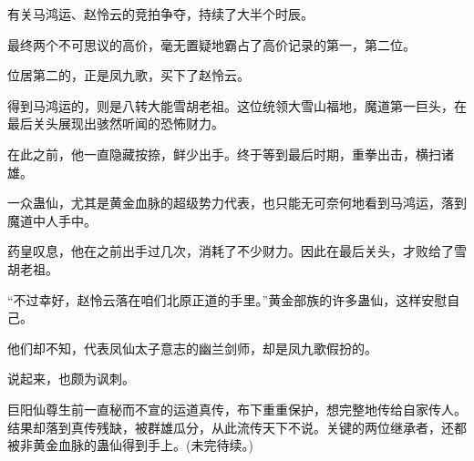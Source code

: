 \begin{this_body}
有关马鸿运、赵怜云的竞拍争夺，持续了大半个时辰。

最终两个不可思议的高价，毫无置疑地霸占了高价记录的第一，第二位。

位居第二的，正是凤九歌，买下了赵怜云。

得到马鸿运的，则是八转大能雪胡老祖。这位统领大雪山福地，魔道第一巨头，在最后关头展现出骇然听闻的恐怖财力。

在此之前，他一直隐藏按捺，鲜少出手。终于等到最后时期，重拳出击，横扫诸雄。

一众蛊仙，尤其是黄金血脉的超级势力代表，也只能无可奈何地看到马鸿运，落到魔道中人手中。

药皇叹息，他在之前出手过几次，消耗了不少财力。因此在最后关头，才败给了雪胡老祖。

“不过幸好，赵怜云落在咱们北原正道的手里。”黄金部族的许多蛊仙，这样安慰自己。

他们却不知，代表凤仙太子意志的幽兰剑师，却是凤九歌假扮的。

说起来，也颇为讽刺。

巨阳仙尊生前一直秘而不宣的运道真传，布下重重保护，想完整地传给自家传人。结果却落到真传残缺，被群雄瓜分，从此流传天下不说。关键的两位继承者，还都被非黄金血脉的蛊仙得到手上。(未完待续。)

\end{this_body}

